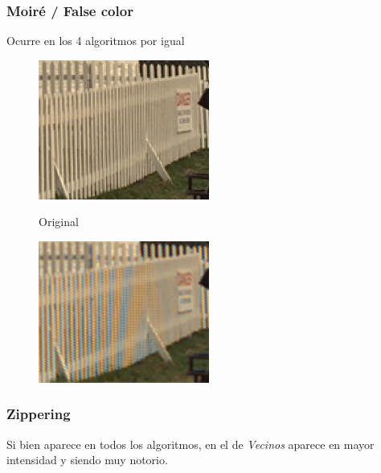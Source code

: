 {\subsubsection{Moiré / False color}
Ocurre en los 4 algoritmos por igual
\begin{figure}[h]
\begin{center}
       \includegraphics[width=0.5\textwidth]{imagenes/img8_moire_original.png}
        \caption{Original}
        \end{center}
\endminipage
{}
\begin{center}
       \includegraphics[width=0.5\textwidth]{imagenes/img8_moire.png}
        \caption{}
         \end{center}
\endminipage
\end{figure}
\subsubsection{Zippering}

Si bien aparece en todos los algoritmos, en el de \textit{Vecinos} aparece en mayor intensidad y siendo muy notorio.

}
